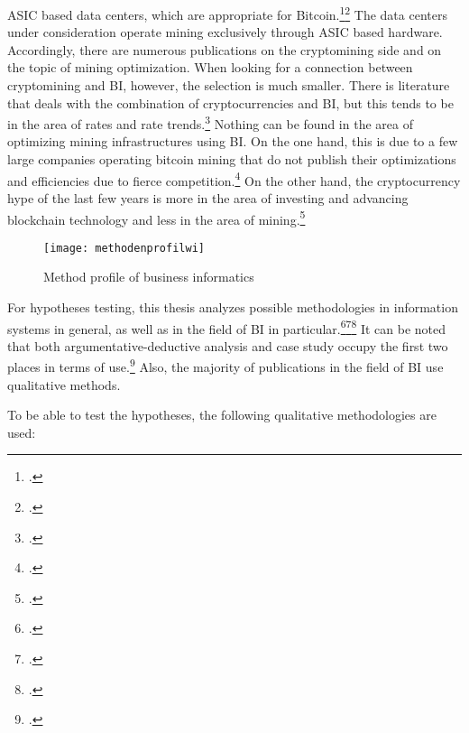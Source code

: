 \begin{enumerate}
    \ac{ASIC} based data centers, which are appropriate for Bitcoin.\footcite[Cf.][]{li2019blockchain}\footcite[Cf.][]{xie2018extreme}
    The data centers under consideration operate mining exclusively through \ac{ASIC} based hardware. Accordingly, there are numerous publications on the
    cryptomining side and on the topic of mining optimization. When looking for a connection between
    cryptomining and \ac{BI}, however, the selection is much smaller. There is literature that deals with the combination of
    cryptocurrencies and \ac{BI}, but this tends to be in the area of rates and rate trends.\footcite[Cf.][]{botocs2017bitcoin}
    Nothing can be found in the area of optimizing mining infrastructures using \ac{BI}.
    On the one hand, this is due to a few large companies operating bitcoin mining that do not publish their optimizations and efficiencies
    due to fierce competition.\footcite[Cf.][]{btccom2021miner} On the other hand, the cryptocurrency hype of the
    last few years is more in the area of investing and advancing blockchain technology and less in the area of
    mining.\footcite[Cf.][]{friedlmaier2018disrupting} 
\end{enumerate}

\begin{figure}[H]
    \caption{Method profile of business informatics}
    \texttt{[image: methodenprofilwi]}
    \label{figure:methodenprofilwi}
    \\
    \cite[Source: Based on][Fig. 3]{wilde2007forschungsmethoden}
\end{figure}

For hypotheses testing, this thesis analyzes possible methodologies in information systems in general, as well as in the field
of BI in particular.\footcite[Cf.][]{wilde2007forschungsmethoden}\footcite[Cf.][]{wilde2006methodenspektrum}\footcite[Cf.][]{jourdan2008business} 
It can be noted that both argumentative-deductive analysis and case study occupy the first two places in terms of
use.\footcite[Cf.][Fig. 2]{wilde2007forschungsmethoden} Also, the majority of publications in the field of
\ac{BI} use qualitative methods.

To be able to test the hypotheses, the following qualitative methodologies are used:

